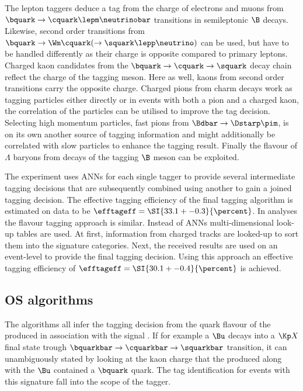The lepton taggers deduce a tag from the charge of electrons and muons from
$\bquark \to \cquark \lepm \neutrinobar$ transitions in semileptonic $\B$
decays. Likewise, second order transitions from $\bquark \to \Wm \cquark ( \to
\squark \lepp \neutrino )$ can be used, but have to be handled differently as
their charge is opposite compared to primary leptons. Charged kaon candidates
from the $\bquark \to \cquark \to \squark$ decay chain reflect the charge of the
tagging meson. Here as well, kaons from second order transitions carry the
opposite charge. Charged pions from charm decays work as tagging particles
either directly or in events with both a pion and a charged kaon, the
correlation of the particles can be utilised to improve the tag decision.
Selecting high momentum particles, \eg fast pions from $\Bdbar \to \Dstarp
\pim$, is on its own another source of tagging information and might
additionally be correlated with slow particles to enhance the tagging result.
Finally the flavour of $\Lambda$ baryons from decays of the tagging $\B$ meson
can be exploited.

The \Babar experiment uses \acp{ANN} for each single tagger to provide several
intermediate tagging decisions that are subsequently combined using another \ANN
to gain a joined tagging decision. The effective tagging efficiency of the final
\Babar tagging algorithm is estimated on data to be $\efftageff = \SI{33.1 +-
0.3}{\percent}$. In \Belle analyses the flavour tagging approach is similar.
Instead of \acp{ANN} multi-dimensional look-up tables are used. At first,
information from charged tracks are looked-up to sort them into the signature
categories. Next, the received results are used on an event-level to provide the
final tagging decision. Using this approach an effective tagging efficiency of
$\efftageff = \SI{30.1 +- 0.4}{\percent}$ is achieved.

\subsection{\Acl{OS} algorithms}
\label{sec:flavour_tagging:os}

The \OS algorithms all infer the tagging decision from the quark flavour of the
\bhadron produced in association with the signal \Bmeson. If for example a $\Bu$
decays into a $\Kp X$ final state trough $\bquarkbar \to \cquarkbar \to
\squarkbar$ transition, it can unambiguously stated by looking at the kaon
charge that the \bhadron produced along with the $\Bu$ contained a $\bquark$
quark. The tag identification for events with this signature fall into the scope
of the \OSK tagger.

